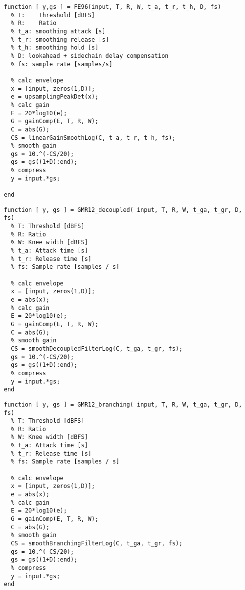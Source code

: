 \documentclass[../main2.tex]{subfiles}
\begin{document}

\begin{lstlisting}[style=customc]
function [ y,gs ] = FE96(input, T, R, W, t_a, t_r, t_h, D, fs)
  % T:    Threshold [dBFS]
  % R:    Ratio
  % t_a: smoothing attack [s]
  % t_r: smoothing release [s]
  % t_h: smoothing hold [s]
  % D: lookahead + sidechain delay compensation
  % fs: sample rate [samples/s]
  
  % calc envelope
  x = [input, zeros(1,D)];
  e = upsamplingPeakDet(x);
  % calc gain
  E = 20*log10(e);
  G = gainComp(E, T, R, W);
  C = abs(G);
  CS = linearGainSmoothLog(C, t_a, t_r, t_h, fs);
  % smooth gain
  gs = 10.^(-CS/20);
  gs = gs((1+D):end);
  % compress
  y = input.*gs;

end
\end{lstlisting}


\begin{lstlisting}[style=customc]
function [ y, gs ] = GMR12_decoupled( input, T, R, W, t_ga, t_gr, D, fs)
  % T: Threshold [dBFS]
  % R: Ratio
  % W: Knee width [dBFS]
  % t_a: Attack time [s]
  % t_r: Release time [s]
  % fs: Sample rate [samples / s]
  
  % calc envelope
  x = [input, zeros(1,D)];
  e = abs(x);
  % calc gain
  E = 20*log10(e);
  G = gainComp(E, T, R, W);
  C = abs(G);
  % smooth gain
  CS = smoothDecoupledFilterLog(C, t_ga, t_gr, fs);
  gs = 10.^(-CS/20);
  gs = gs((1+D):end);
  % compress
  y = input.*gs;
end
\end{lstlisting}


\begin{lstlisting}[style=customc]
function [ y, gs ] = GMR12_branching( input, T, R, W, t_ga, t_gr, D, fs)
  % T: Threshold [dBFS]
  % R: Ratio
  % W: Knee width [dBFS]
  % t_a: Attack time [s]
  % t_r: Release time [s]
  % fs: Sample rate [samples / s]
  
  % calc envelope
  x = [input, zeros(1,D)];
  e = abs(x);
  % calc gain
  E = 20*log10(e);
  G = gainComp(E, T, R, W);
  C = abs(G);
  % smooth gain
  CS = smoothBranchingFilterLog(C, t_ga, t_gr, fs);
  gs = 10.^(-CS/20);
  gs = gs((1+D):end);
  % compress
  y = input.*gs;
end
\end{lstlisting}
\end{document}
